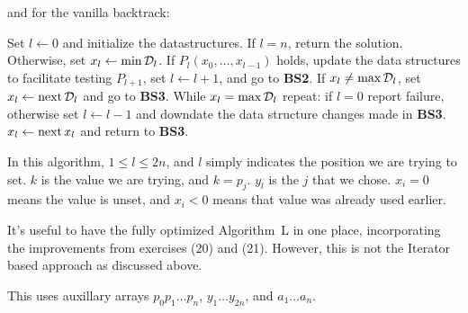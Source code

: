\noindent and for the vanilla backtrack:

\vskip 0.1in
 Set $l \leftarrow 0$ and initialize the 
 datastructures.\hfil\break
{} If $l = n$, return the solution.  Otherwise, set 
 $x_l \leftarrow {\min}\,{\cal D}_l$.\hfil\break
{} If $P_l\left(x_0, \ldots, x_{l-1}\right)$ holds, update the 
 data structures to facilitate testing $P_{l+1}$, set $l \leftarrow l + 1$, and 
  go to {\bf BS2}.\hfil\break
{} If $x_l \neq {\rm max}\,{\cal D}_l$, set 
  $x_l \leftarrow {\rm next}\,{\cal D}_l$ and go to {\bf BS3}.\hfil\break
{} While $x_l = {\rm max}\,{\cal D}_l$ repeat: if $l = 0$ 
 report failure, otherwise set $l \leftarrow l - 1$ and downdate the data 
 structure changes made in {\bf BS3}.\hfil\break
{} $x_l \leftarrow {\rm next}\,x_l$ and return to 
 {\bf BS3}.\hfil\break


\noindent In this algorithm, $1 \le l \le 2n$, and $l$ simply indicates the 
position we are trying to set.  $k$ is the value we are trying, and $k = p_j$.
$y_l$ is the $j$ that we chose.  $x_i = 0$ means the value is unset, and 
$x_i < 0$ means that value was already used earlier. 


\noindent It's useful to have the fully optimized Algorithm~L in one place, 
incorporating the improvements from exercises (20) and (21).   However, this
is not the Iterator based approach as discussed above.

\noindent This uses auxillary arrays $p_0 p_1 \ldots p_n$, $y_1 \ldots y_{2n}$, 
and $a_1 \ldots a_n$.

